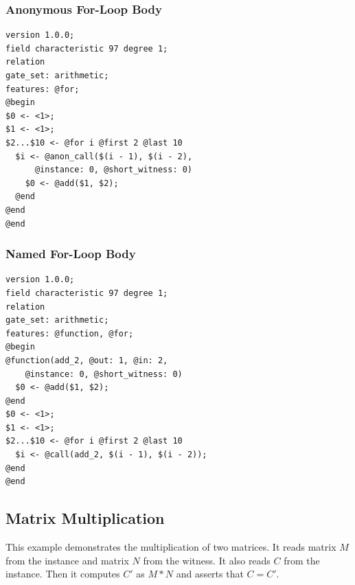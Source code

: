 \documentclass[12pt]{article}
\begin{document}
\subsubsection*{Anonymous For-Loop Body}
\lstset{language=ir}
\begin{lstlisting}
version 1.0.0;
field characteristic 97 degree 1;
relation
gate_set: arithmetic;
features: @for;
@begin
$0 <- <1>;
$1 <- <1>;
$2...$10 <- @for i @first 2 @last 10
  $i <- @anon_call($(i - 1), $(i - 2),
      @instance: 0, @short_witness: 0)
    $0 <- @add($1, $2);
  @end
@end
@end
\end{lstlisting}

\subsubsection*{Named For-Loop Body}
\lstset{language=ir}
\begin{lstlisting}
version 1.0.0;
field characteristic 97 degree 1;
relation
gate_set: arithmetic;
features: @function, @for;
@begin
@function(add_2, @out: 1, @in: 2,
    @instance: 0, @short_witness: 0)
  $0 <- @add($1, $2);
@end
$0 <- <1>;
$1 <- <1>;
$2...$10 <- @for i @first 2 @last 10
  $i <- @call(add_2, $(i - 1), $(i - 2));
@end
@end
\end{lstlisting}

\subsection{Matrix Multiplication}
This example demonstrates the multiplication of two matrices.
It reads matrix $M$ from the instance and matrix $N$ from the witness.
It also reads $C$ from the instance.
Then it computes $C'$ as $M*N$ and asserts that $C=C'$.\\
\end{document}
